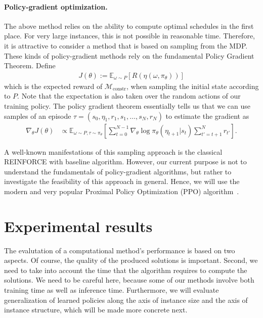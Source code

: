 \documentclass[a4paper]{report}
\theoremstyle{definition}
\theoremstyle{plain}
\begin{document}
\paragraph{Policy-gradient optimization.}

The above method relies on the ability to compute optimal schedules in the first
place. For very large instances, this is not possible in reasonable time.
Therefore, it is attractive to consider a method that is based on sampling from
the MDP. These kinds of policy-gradient methods rely on the fundamental Policy
Gradient Theorem.
%
Define
\begin{align}
  J(\theta) := \mathbb{E}_{\omega \sim P}[R(\eta(\omega, \pi_\theta))] 
\end{align}
which is the expected reward of $\mathcal{M}_\mathrm{constr}$, when sampling the
initial state according to $P$.
Note that the expectation is also taken over the random actions of our training policy.
%
The policy gradient theorem essentially tells us that we can use samples of an
episode $\tau = (s_0, \eta_1, r_1, s_1, \dots, s_N, r_N)$ to estimate the gradient as
%
\begin{align}
  \nabla_\theta J(\theta) &\propto \mathbb{E}_{\omega \sim P, \tau \sim \pi_\theta} \left[ \sum_{t=0}^{N-1} \nabla_\theta \log \pi_\theta(\eta_{t+1} | s_{t}) \sum_{t'=t+1}^{N} r_{t'}  \right]  .
\end{align}

A well-known manifestations of this sampling approach is the classical REINFORCE
with baseline algorithm. However, our current purpose is not to understand the
fundamentals of policy-gradient algorithms, but rather to investigate the
feasibility of this approach in general. Hence, we will use the modern and very
popular Proximal Policy Optimization (PPO) algorithm~\cite{schulmanProximalPolicyOptimization2017}.


\clearpage
\section{Experimental results}\label{sec:results}

The evalutation of a computational method's performance is based on two aspects.
Of course, the quality of the produced solutions is important. Second, we need
to take into account the time that the algorithm requires to compute the
solutions. We need to be careful here, because some of our methods involve both
training time as well as inference time.
Furthermore, we will evaluate generalization of learned policies along the axis
of instance size and the axis of instance structure, which will be made more
concrete next.
\end{document}
